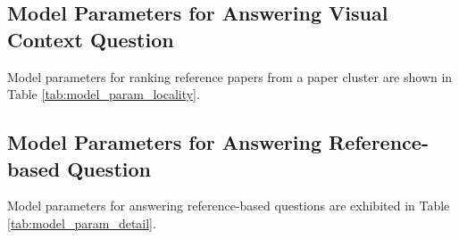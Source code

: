 \subsection{Model Parameters for Answering Visual Context Question}
Model parameters for ranking reference papers from a paper cluster are shown in Table \ref{tab:model_param_locality}.



\subsection{Model Parameters for Answering Reference-based Question}
Model parameters for answering reference-based questions are exhibited in Table \ref{tab:model_param_detail}.

